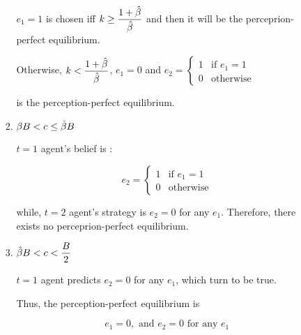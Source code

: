\documentclass{jsarticle}
\begin{document}
\begin{enumerate}
\begin{enumerate}
\begin{enumerate}
 $e_1=1$ is chosen iff $ k \geq \dfrac{1+\Hat{\beta}}{\Hat{\beta}}$ and then it will be the perceprion-perfect equilibrium.
 
 Otherwise, $ k < \dfrac{1+\Hat{\beta}}{\Hat{\beta}}$, $e_1=0$ and $e_2 = \begin{cases}
 1 & \text{if } e_1=1 \\
 0 & \text{otherwise}
 \end{cases} $
 
 is the perception-perfect equilibrium.
 
 \item $\beta B < c \leq \Hat{\beta} B$
 
 $t=1$ agent's belief is :
 
 \[e_2 = \begin{cases}
 1 & \text{if } e_1=1 \\
 0 & \text{otherwise}
 \end{cases} \]
 
 while, $t=2$ agent's strategy is $e_2=0$ for any $e_1$. Therefore, there exists no perceprion-perfect equilibrium.
 
 \item $\Hat{\beta} B < c < \dfrac{B}{2}$
 
 $t=1$ agent predicts $e_2=0$ for any $e_1$, which turn to be true.
 
 Thus, the perception-perfect equilibrium is
 
 \[e_1=0, \text{ and } e_2=0 \text{ for any }e_1 \]
 
 \end{enumerate}

\end{enumerate}

\end{enumerate}
\end{document}
